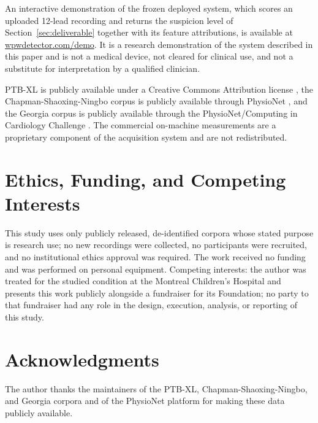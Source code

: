 \documentclass[11pt]{article}
\begin{document}
An interactive demonstration of the frozen deployed system, which scores an uploaded 12-lead recording and returns the suspicion level of Section~\ref{sec:deliverable} together with its feature attributions, is available at \href{https://wpwdetector.com/demo}{wpwdetector.com/demo}. It is a research demonstration of the system described in this paper and is not a medical device, not cleared for clinical use, and not a substitute for interpretation by a qualified clinician.

PTB-XL is publicly available under a Creative Commons Attribution license \cite{ptbxl}, the Chapman-Shaoxing-Ningbo corpus is publicly available through PhysioNet \cite{csn_physionet,csn_nature,physionet}, and the Georgia corpus is publicly available through the PhysioNet/Computing in Cardiology Challenge \cite{georgia}. The commercial on-machine measurements are a proprietary component of the acquisition system and are not redistributed.

\FloatBarrier
\section*{Ethics, Funding, and Competing Interests}

This study uses only publicly released, de-identified corpora whose stated purpose is research use; no new recordings were collected, no participants were recruited, and no institutional ethics approval was required. The work received no funding and was performed on personal equipment. Competing interests: the author was treated for the studied condition at the Montreal Children's Hospital and presents this work publicly alongside a fundraiser for its Foundation; no party to that fundraiser had any role in the design, execution, analysis, or reporting of this study.

\FloatBarrier
\section*{Acknowledgments}

The author thanks the maintainers of the PTB-XL, Chapman-Shaoxing-Ningbo, and Georgia corpora and of the PhysioNet platform for making these data publicly available.
\end{document}
